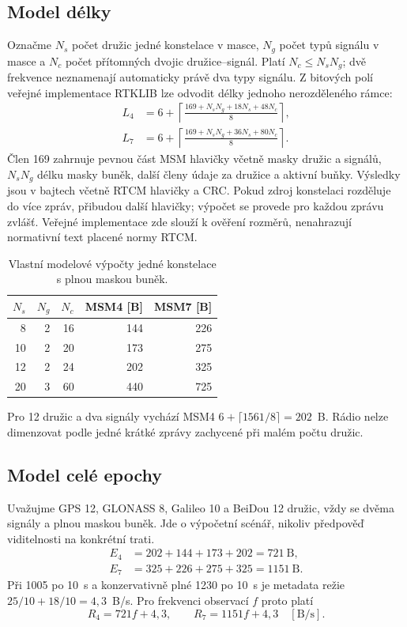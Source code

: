 \documentclass[11pt,a4paper]{article}
\begin{document}
\subsection{Model délky}
Označme $N_s$ počet družic jedné konstelace v masce, $N_g$ počet typů signálu v masce a $N_c$ počet přítomných dvojic družice--signál. Platí $N_c\leq N_sN_g$; dvě frekvence neznamenají automaticky právě dva typy signálu. Z bitových polí veřejné implementace RTKLIB lze odvodit délky jednoho nerozděleného rámce:\cite{rtcm-encoder}
\begin{align}
 L_4&=6+\left\lceil
 \frac{169+N_sN_g+18N_s+48N_c}{8}\right\rceil,\\
 L_7&=6+\left\lceil
 \frac{169+N_sN_g+36N_s+80N_c}{8}\right\rceil.
\end{align}
Člen 169 zahrnuje pevnou část MSM hlavičky včetně masky družic a signálů, $N_sN_g$ délku masky buněk, další členy údaje za družice a aktivní buňky. Výsledky jsou v bajtech včetně RTCM hlavičky a CRC. Pokud zdroj konstelaci rozděluje do více zpráv, přibudou další hlavičky; výpočet se provede pro každou zprávu zvlášť. Veřejné implementace zde slouží k ověření rozměrů, nenahrazují normativní text placené normy RTCM.

\par
\begin{table}[htbp]\centering\small
\caption{Vlastní modelové výpočty jedné konstelace s plnou maskou buněk.}
\begin{tabular}{rrrrr}\toprule
$N_s$ & $N_g$ & $N_c$ & MSM4 [B] & MSM7 [B]\\\midrule
8 & 2 & 16 & 144 & 226\\
10 & 2 & 20 & 173 & 275\\
12 & 2 & 24 & 202 & 325\\
20 & 3 & 60 & 440 & 725\\
\bottomrule\end{tabular}\end{table}
\par
Pro 12 družic a dva signály vychází MSM4
$6+\lceil1561/8\rceil=202$~B. Rádio nelze dimenzovat podle jedné krátké zprávy zachycené při malém počtu družic.

\subsection{Model celé epochy}
Uvažujme GPS 12, GLONASS 8, Galileo 10 a BeiDou 12 družic, vždy se dvěma signály a plnou maskou buněk. Jde o výpočetní scénář, nikoliv předpověď viditelnosti na konkrétní trati.
\begin{align}
 E_4&=202+144+173+202=721~\mathrm B,\\
 E_7&=325+226+275+325=1151~\mathrm B.
\end{align}
Při 1005 po 10~s a konzervativně plné 1230 po 10~s je metadata režie $25/10+18/10=4{,}3$~B/s. Pro frekvenci observací $f$ proto platí
\begin{equation}
 R_4=721f+4{,}3,\qquad R_7=1151f+4{,}3
 \quad [\mathrm{B/s}].
\end{equation}
\end{document}
